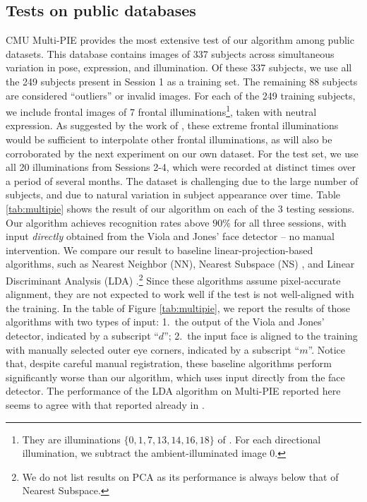 \subsection{Tests on public databases}\vspace{0mm}
CMU Multi-PIE provides the most extensive test of our algorithm among public datasets. This database contains images of 337 subjects across simultaneous variation in pose, expression, and illumination. Of these 337 subjects, we use all the 249 subjects present in Session 1 as a training set. The remaining 88 subjects are considered ``outliers'' or invalid images. For each of the 249 training subjects, we include frontal images of 7 frontal illuminations\footnote{They are illuminations $\{0,1,7,13,14,16,18\}$ of \cite{Gross2008-FGR}.  For each directional illumination, we subtract the ambient-illuminated image 0.}, taken with neutral expression. As suggested by the work of \cite{Georghiades2001-PAMI}, these extreme frontal illuminations would be sufficient to interpolate other frontal illuminations, as will also be corroborated by the next experiment on our own dataset. For the test set, we use all 20 illuminations from Sessions 2-4, which were recorded at distinct times over a period of several months. The dataset is challenging due to the large number of subjects, and due to natural variation in subject appearance over time. Table \ref{tab:multipie} shows the result of our algorithm on each of the 3 testing sessions. Our algorithm achieves recognition rates above $90\%$ for all three sessions, with input {\em directly} obtained from the Viola and Jones' face detector -- no manual intervention. We compare our result to baseline linear-projection-based algorithms, such as Nearest Neighbor (NN), Nearest Subspace (NS) \cite{Lee2005-PAMI}, and Linear Discriminant Analysis (LDA) \cite{Belhumeur1997-PAMI}.\footnote{We do not list results on PCA \cite{Turk1991-CVPR} as its performance is always below that of Nearest Subspace.} Since these algorithms assume pixel-accurate alignment, they are not expected to work well if the test is not well-aligned with the training. In the table of Figure \ref{tab:multipie}, we report the results of those algorithms with two types of input: 1.\ the output of the Viola and Jones' detector, indicated by a subscript ``$d$''; 2.\ the input face is aligned to the training with manually selected outer eye corners, indicated by a subscript ``$m$''. Notice that, despite careful manual registration, these baseline algorithms perform significantly worse than our algorithm, which uses input directly from the face detector. The performance of the LDA algorithm on Multi-PIE reported here seems to agree with that reported already in \cite{Gross2008-FGR}.\vspace{0mm}

